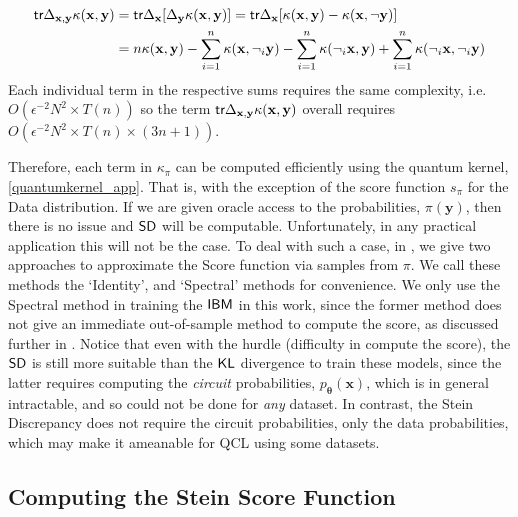 \begin{align}
    \textsf{tr}\Delta_{\mathbf{x}, \mathbf{y}}\kappa(\mathbf{x}, \mathbf{y}) &= \textsf{tr}\Delta_{\mathbf{x}}[ \Delta_{\mathbf{y}}\kappa(\mathbf{x}, \mathbf{y})] \nonumber = \textsf{tr}\Delta_{\mathbf{x}}[\kappa(\mathbf{x}, \mathbf{y}) - \kappa(\mathbf{x}, \neg\mathbf{y})] \nonumber \\
    &= n\kappa(\mathbf{x}, \mathbf{y}) - \sum\limits_{i=1}^n\kappa(\mathbf{x}, \neg_i\mathbf{y}) - \sum\limits_{i=1}^n\kappa(\neg_i\mathbf{x}, \mathbf{y})\nonumber + \sum\limits_{i=1}^n\kappa(\neg_i\mathbf{x}, \neg_i\mathbf{y})
\end{align}
Each individual term in the respective sums requires the same complexity, i.e.\@ $O(\epsilon^{-2}N^2 \times T(n))$ so the term $\textsf{tr}\Delta_{\mathbf{x}, \mathbf{y}}\kappa(\mathbf{x}, \mathbf{y})$ overall requires $O(\epsilon^{-2}N^2 \times T(n)\times (3n+1))$. 

Therefore, each term in $\kappa_\pi$ can be computed efficiently using the quantum kernel, \eqref{quantumkernel_app}. That is, with the exception of the score function $s_\pi$ for the Data distribution. If we are given oracle access to the probabilities, $\pi(\mathbf{y})$, then there is no issue and $\operatorname{\textsf{SD}}$ will be computable. Unfortunately, in any practical application this will not be the case. To deal with such a case, in , we give two approaches to approximate the Score function via samples from $\pi$. We call these methods the `Identity', and `Spectral' methods for convenience. We only use the Spectral method in training the $\textsf{IBM}$ in this work, since the former method does not give an immediate out-of-sample method to compute the score, as discussed further in . Notice that even with the hurdle (difficulty in compute the score), the $\operatorname{\textsf{SD}}$ is still more suitable than the $\operatorname{\textsf{KL}}$ divergence to train these models, since the latter requires computing the \textit{circuit} probabilities, $p_{\boldsymbol\theta}(\mathbf{x})$, which is in general intractable, and so could not be done for \textit{any} dataset. In contrast, the Stein Discrepancy does not require the circuit probabilities, only the data probabilities, which may make it ameanable for QCL using some datasets.


\subsection{Computing the Stein Score Function} 
\label{supp_matt:steinscoremethod}

